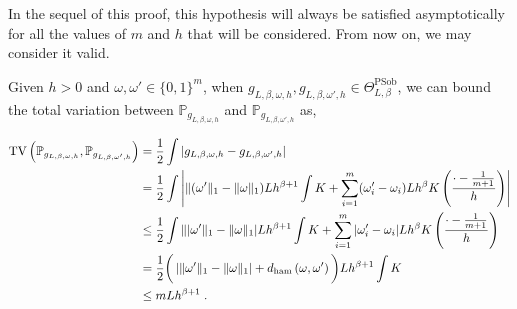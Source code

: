 \documentclass[10pt]{article} %
\newcommand{\Prob}[0]{\mathbb{P}}
\newcommand\tv[2]{\mathrm{TV}\left( {#1}, {#2} \right)}
\newcommand\ham[2]{d_\mathrm{ham}\left( {#1}, {#2} \right)}
\newcommand\p[1]{\left( {#1}\right)}
\begin{document}
In the sequel of this proof, this hypothesis will always be satisfied asymptotically for all the values of $m$ and $h$ that will be considered. From now on, we may consider it valid.

Given $h>0$ and $\omega, \omega' \in \{0, 1\}^m$, when $g_{L, \beta, \omega, h}, g_{L, \beta, \omega', h} \in \Theta^{\text{PSob}}_{L, \beta}$, we can bound the total variation between $\Prob_{g_{L, \beta, \omega, h}}$ and  $\Prob_{g_{L, \beta, \omega', h}}$ as,

\begin{align}
    \tv{\Prob_{g_{L, \beta, \omega, h}}}{\Prob_{g_{L, \beta, \omega', h}}} 
    &=
    \frac{1}{2} \int \left| g_{L, \beta, \omega, h} - g_{L, \beta, \omega', h} \right| \notag \\
    &=
    \frac{1}{2} \int \left| \| (\omega' \|_1 - \| \omega \|_1) L h^{\beta + 1} \int K + \sum_{i=1}^m (\omega_i' - \omega_i) L h^{\beta } K\p{\frac{\cdot - \frac{1}{m+1}}{h}}\right| \notag\\
    &\leq
   \frac{1}{2} \int \| |\omega' \|_1 - \| \omega \|_1| L h^{\beta + 1} \int K + \sum_{i=1}^m |\omega_i' - \omega_i| L h^{\beta } K\p{\frac{\cdot - \frac{1}{m+1}}{h}} \notag\\
    &=
    \frac{1}{2} \bigg( \left| \| \omega' \|_1 - \| \omega \|_1\right|  + \ham{\omega}{\omega'}\bigg) L h^{\beta+1} \int K \label{eq:tvkernelsawham}\\
    &\leq mL h^{\beta+1} \label{eq:tvkernelsaw}\;.
\end{align}
\end{document}
